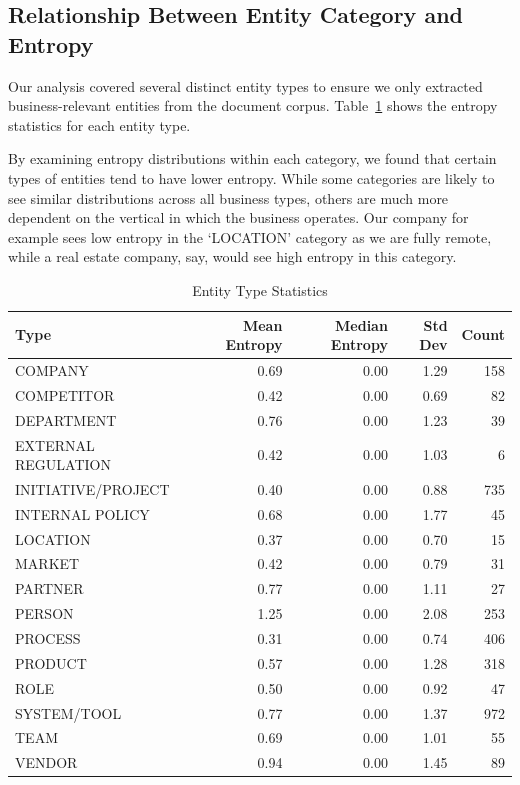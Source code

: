 \documentclass[11pt,a4paper]{article}
\begin{document}
\subsection{Relationship Between Entity Category and Entropy}

Our analysis covered several distinct entity types to ensure we only extracted business-relevant entities from the document corpus. Table~\ref{tab:entity-types} shows the entropy statistics for each entity type.

By examining entropy distributions within each category, we found that certain types of entities tend to have lower entropy. While some categories are likely to see similar distributions across all business types, others are much more dependent on the vertical in which the business operates. Our company for example sees low entropy in the `LOCATION' category as we are fully remote, while a real estate company, say, would see high entropy in this category.

\begin{table}[H]
\centering
\caption{Entity Type Statistics}\label{tab:entity-types}
\begin{tabular}{lrrrr}
\hline
Type & Mean Entropy & Median Entropy & Std Dev & Count \\
\hline
COMPANY & 0.69 & 0.00 & 1.29 & 158 \\
COMPETITOR & 0.42 & 0.00 & 0.69 & 82 \\
DEPARTMENT & 0.76 & 0.00 & 1.23 & 39 \\
EXTERNAL REGULATION & 0.42 & 0.00 & 1.03 & 6 \\
INITIATIVE/PROJECT & 0.40 & 0.00 & 0.88 & 735 \\
INTERNAL POLICY & 0.68 & 0.00 & 1.77 & 45 \\
LOCATION & 0.37 & 0.00 & 0.70 & 15 \\
MARKET & 0.42 & 0.00 & 0.79 & 31 \\
PARTNER & 0.77 & 0.00 & 1.11 & 27 \\
PERSON & 1.25 & 0.00 & 2.08 & 253 \\
PROCESS & 0.31 & 0.00 & 0.74 & 406 \\
PRODUCT & 0.57 & 0.00 & 1.28 & 318 \\
ROLE & 0.50 & 0.00 & 0.92 & 47 \\
SYSTEM/TOOL & 0.77 & 0.00 & 1.37 & 972 \\
TEAM & 0.69 & 0.00 & 1.01 & 55 \\
VENDOR & 0.94 & 0.00 & 1.45 & 89 \\
\hline
\end{tabular}
\end{table}
\end{document}
